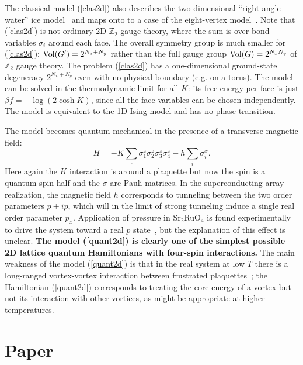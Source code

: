 \documentclass[prl,twocolumn,showpacs,superscriptaddress,preprintnumbers,amssymb]{revtex4}
\def\vol{{\rm Vol}}
\newcommand{\beq}{\begin{equation}}
\newcommand{\eeq}{\end{equation}}
\begin{document}
The classical model (\ref{clas2d}) also describes the
two-dimensional ``right-angle water'' ice model~\cite{ziman} and
maps onto to a case of the eight-vertex
model~\cite{baxterbook,moorelee}.  Note that (\ref{clas2d}) is not
ordinary 2D $\mathbb{Z}_2$ gauge theory, where the sum is over
bond variables $\sigma_i$ around each face.  The
overall symmetry group is much smaller for
(\ref{clas2d}): $\vol(G^\prime) = 2^{N_x + N_y}$ rather than
the full gauge group $\vol(G) = 2^{N_x N_y}$ of $\mathbb{Z}_2$
gauge theory.  The problem (\ref{clas2d}) has a one-dimensional
ground-state degeneracy $2^{N_x+N_y}$ even with no physical boundary (e.g. on a
torus).  The model can be solved in the thermodynamic limit for
all $K$: its free energy per face is just $\beta f=-\log(2 \cosh K)$,
since all the face variables can be chosen independently. 
The model is equivalent to the 1D Ising model and has no
phase transition.

The model becomes quantum-mechanical in the presence of a transverse
magnetic field: \beq H = -K \sum_\square \sigma^z_1 \sigma^z_2
\sigma^z_3 \sigma^z_4 - h \sum_i \sigma_i^x. \label{quant2d} \eeq
Here again the $K$ interaction is around a plaquette but now the
spin is a quantum spin-half and the $\sigma$ are Pauli matrices.
In the superconducting array realization, the magnetic field $h$
corresponds to tunneling between the two order parameters $p\pm
ip$, which will in the limit of strong tunneling induce a single real order parameter $p_x$.  Application of pressure in Sr$_2$RuO$_4$ is found experimentally to drive the system toward a real $p$ state~\cite{mackenziemaeno}, but the explanation of this effect is unclear.  \textbf{
The model (\ref{quant2d}) is clearly one of the simplest possible 2D lattice quantum Hamiltonians with four-spin interactions.}  The main weakness of the model (\ref{quant2d}) is that in the real system at low $T$ there is a long-ranged
vortex-vortex interaction between frustrated
plaquettes~\cite{moorelee}; the Hamiltonian (\ref{quant2d})
corresponds to treating the core energy of a vortex but not its
interaction with other vortices, as might be appropriate at higher
temperatures.

\section*{Paper} 
\end{document}
